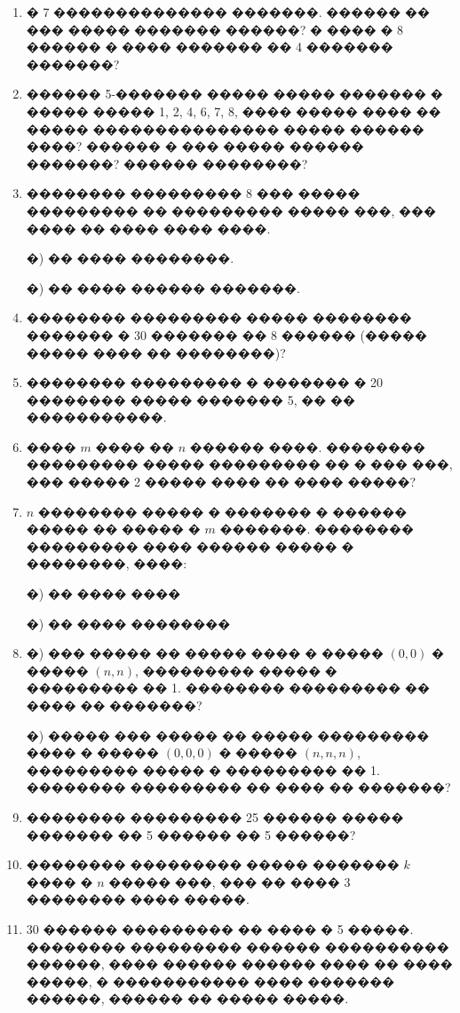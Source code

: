 \documentclass[a4paper,12pt]{article}
\begin{document}
\begin{enumerate}
 \item � 7 �������������� �������. ������ �� ��� ����� ������� ������? � ���� � 8 ������ � ���� ������� �� 4 ������� �������?

 \item ������ 5-������� ����� ����� ������� � ����� ����� 1, 2, 4, 6, 7, 8, ���� ����� ���� �� �����
��������������� ����� ������ ����? ������ � ��� ����� ������ �������? ������ ��������?

\item �������� ��������� 8 ��� ����� ��������� �� ��������� ����� ���, ��� ���� �� ���� ���� ����.

�) �� ���� ��������.

�) �� ���� ������ �������.

\item �������� ��������� ����� �������� ������� � 30 ������� �� 8 ������ (����� ����� ���� �� ��������)?

\item �������� ��������� � ������� � 20 �������� ����� ������� 5, �� �� �����������.

\item ���� $m$ ���� �� $n$ ������ ����. �������� ��������� ����� ��������� �� � ��� ���, ��� ����� 2 ����� ���� �� ���� �����?

\item $n$ �������� ����� � ������� � ������ ����� �� ����� � $m$ �������. �������� ��������� ���� ������ ����� � ��������, ����:

�) �� ���� ����

�) �� ���� ��������

\item �) ��� ����� �� ����� ���� � ����� $(0,0)$ � ����� $(n,n)$, ��������� ����� � ��������� �� 1. �������� ��������� �� ���� �� �������?

�) ����� ��� ����� �� ����� ��������� ���� � ����� $(0,0,0)$ � ����� $(n,n,n)$, ��������� ����� � ��������� �� 1. �������� ��������� �� ���� �� �������?

\item �������� ��������� 25 ������ ����� ������� �� 5 ������ �� 5 ������?

\item �������� ��������� ����� ������� $k$ ���� � $n$ ����� ���, ��� �� ���� 3 �������� ���� �����.

\item 30 ������ ��������� �� ���� � 5 �����. �������� ��������� ������ ���������� ������, ���� ������ ������ ���� �� ���� �����, � ����������� ���� ������� ������, ������ �� ����� �����.


\end{enumerate}
\end{document}
